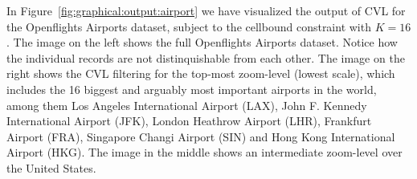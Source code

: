 In Figure~\ref{fig:graphical:output:airport} we have visualized the output of CVL for the Openflights Airports dataset, subject to the cellbound constraint with $K=16$. The image on the left shows the full Openflights Airports dataset. Notice how the individual records are not distinquishable from each other. The image on the right shows the CVL filtering for the top-most zoom-level (lowest scale), which includes the 16 biggest and arguably most important airports in the world, among them Los Angeles International Airport (LAX), John F. Kennedy International Airport (JFK), London Heathrow Airport (LHR), Frankfurt Airport (FRA), Singapore Changi Airport (SIN) and Hong Kong International Airport (HKG). The image in the middle shows an intermediate zoom-level over the United States.

